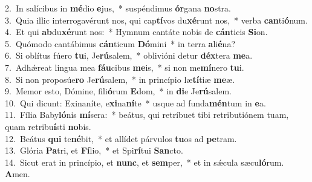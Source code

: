 {2.~}In salícibus in \textbf{mé}dio \textbf{e}jus,~* suspéndimus \textbf{ór}gana \textbf{no}stra.\\
{3.~}Quia illic interrogavérunt nos, qui cap\textbf{tí}vos du\textbf{xé}runt nos,~* verba \textbf{can}ti\textbf{ó}num.\\
{4.~}Et qui \textbf{ab}du\textbf{xé}runt nos:~* Hymnum cantáte nobis de \textbf{cán}ticis \textbf{Si}on.\\
{5.~}Quómodo cantábimus \textbf{cán}ticum \textbf{Dó}mini~* in terra \textbf{a}li\textbf{é}na?\\
{6.~}Si oblítus fúero \textbf{tu}i, Je\textbf{rú}salem,~* oblivióni detur \textbf{déx}tera \textbf{me}a.\\
{7.~}Adhǽreat lingua mea \textbf{fáu}cibus \textbf{me}is,~* si non me\textbf{mí}nero \textbf{tu}i.\\
{8.~}Si non proposúe\textbf{ro} Je\textbf{rú}salem,~* in princípio læ\textbf{tí}tiæ \textbf{me}æ.\\
{9.~}Memor esto, Dómine, fili\textbf{ó}rum \textbf{E}dom,~* in \textbf{di}e Je\textbf{rú}salem.\\
{10.~}Qui dicunt: Exinaníte, e\textbf{xi}na\textbf{ní}te~* usque ad funda\textbf{mén}tum in \textbf{e}a.\\
{11.~}Fília Baby\textbf{ló}nis \textbf{mí}sera:~* beátus, qui retríbuet tibi retributiónem tuam, quam retribu\textbf{í}sti \textbf{no}bis.\\
{12.~}Beátus \textbf{qui} te\textbf{né}bit,~* et allídet párvulos \textbf{tu}os ad \textbf{pe}tram.\\
{13.~}Glória \textbf{Pa}tri, et \textbf{Fí}lio,~* et Spi\textbf{rí}tui \textbf{San}cto.\\
{14.~}Sicut erat in princípio, et \textbf{nunc}, et \textbf{sem}per,~* et in sǽcula sæcu\textbf{ló}rum. \textbf{A}men.\\
